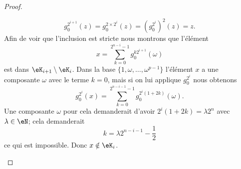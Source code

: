 \begin{proof}
\begin{subproof}
\begin{subproof}
                        \begin{equation}
                            g_0^{2^{i+1}}(z)=g_0^{2\times 2^i}(z)=(g_0^{2^i})^2(z)=z.
                        \end{equation}
                        Afin de voir que l'inclusion est stricte nous montrons que l'élément
                        \begin{equation}\label{EqTBLooWpeGgk}
                            x=\sum_{k=0}^{2^{n-i}-1}g_0^{k2^{i+1}}(\omega)
                        \end{equation}
                        est dans \( \eK_{i+1}\setminus \eK_i\). Dans la base \( \{ 1,\omega,\ldots, \omega^{p-1} \}\) l'élément \( x\) a une composante \( \omega\) avec le terme \( k=0\), mais si on lui applique \( g_0^{2^i}\) nous obtenons
                        \begin{equation}
                            g_0^{2^i}(x)=\sum_{k=0}^{2^{n-i-1}-1}g_0^{2^i(1+2k)}(\omega).
                        \end{equation}
                        Une composante \( \omega\) pour cela demanderait d'avoir \( 2^i(1+2k)=\lambda 2^n\) avec \( \lambda\in \eN\); cela demanderait
                        \begin{equation}
                            k=\lambda 2^{n-i-1}-\frac{ 1 }{2}
                        \end{equation}
                        ce qui est impossible. Donc \( x\notin \eK_{i}\).


\end{subproof}
\end{subproof}
\end{proof}
